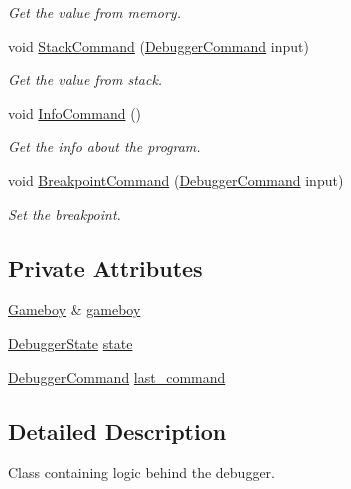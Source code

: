 \begin{DoxyCompactItemize}
\begin{DoxyCompactList}\small\item\em Get the value from memory. \end{DoxyCompactList}\item 
void \mbox{\hyperlink{classDebugger_ad97d4a2bee23dd11e8a019caecbd298e}{Stack\+Command}} (\mbox{\hyperlink{structDebuggerCommand}{Debugger\+Command}} input)
\begin{DoxyCompactList}\small\item\em Get the value from stack. \end{DoxyCompactList}\item 
\mbox{\label{classDebugger_aaa3ecb5e02221af361ffb85f86a59f00}} 
void \mbox{\hyperlink{classDebugger_aaa3ecb5e02221af361ffb85f86a59f00}{Info\+Command}} ()
\begin{DoxyCompactList}\small\item\em Get the info about the program. \end{DoxyCompactList}\item 
void \mbox{\hyperlink{classDebugger_a6d57cbb879d3fdb6f000e220acd3623c}{Breakpoint\+Command}} (\mbox{\hyperlink{structDebuggerCommand}{Debugger\+Command}} input)
\begin{DoxyCompactList}\small\item\em Set the breakpoint. \end{DoxyCompactList}\end{DoxyCompactItemize}
\subsection*{Private Attributes}
\begin{DoxyCompactItemize}
\item 
\mbox{\hyperlink{classGameboy}{Gameboy}} \& \mbox{\hyperlink{classDebugger_aecbc0ccbcf7cbd8d36724edd5b5352ea}{gameboy}}
\item 
\mbox{\hyperlink{structDebuggerState}{Debugger\+State}} \mbox{\hyperlink{classDebugger_a3e0c85871a95c23bf1141c2fd86fc798}{state}}
\item 
\mbox{\hyperlink{structDebuggerCommand}{Debugger\+Command}} \mbox{\hyperlink{classDebugger_a115609b27926527f02ba9edcc4290669}{last\+\_\+command}}
\end{DoxyCompactItemize}


\subsection{Detailed Description}
Class containing logic behind the debugger. 

